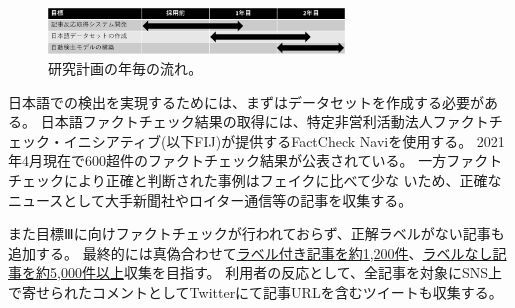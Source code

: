 \setlength\intextsep{0pt}
\setlength\textfloatsep{0pt}
\begin{figure}
    \centering
    \includegraphics[width=0.7\textwidth]{figs/plan.pdf}
    \vspace{-1cm} 
    \caption{研究計画の年毎の流れ。}
    \label{fig:plan}
\end{figure}
日本語での検出を実現するためには、まずはデータセットを作成する必要がある。
日本語ファクトチェック結果の取得には、特定非営利活動法人ファクトチェック・イニシアティブ(以下FIJ)が提供するFactCheck Naviを使用する。
2021年4月現在で600超件のファクトチェック結果が公表されている。%
一方ファクトチェックにより正確と判断された事例はフェイクに比べて少な%
いため、正確なニュースとして大手新聞社やロイター通信等の記事を収集する。

また目標Ⅲに向けファクトチェックが行われておらず、正解ラベルがない記事も追加する。
最終的には真偽合わせて\underline{ラベル付き記事を約1,200件}、\underline{ラベルなし記事を約5,000件以上}収集を目指す。
利用者の反応として、全記事を対象にSNS上で寄せられたコメントとしてTwitterにて記事URLを含むツイートも収集する。

